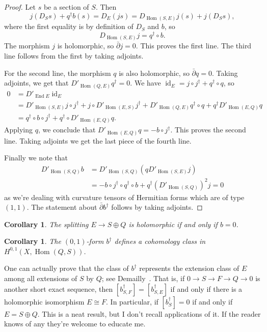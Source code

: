 \documentclass[10pt,a4paper]{article}
\newtheorem{coro}[theo]{Corollary}
\newtheorem*{proof}{Proof}
\DeclareMathOperator{\End}{End}
\DeclareMathOperator{\Hom}{Hom}
\DeclareMathOperator{\id}{id}
\begin{document}
\begin{proof}
Let $s$ be a section of $S$. Then
\[
j(D_S s) + q^\dagger b(s)
= D_E(js)
= D_{\Hom(S,E)}j (s) + j(D_S s),
\]
where the first equality is by definition of $D_S$ and $b$, so
\[
D_{\Hom(S,E)}j = q^\dagger \circ b.
\]
The morphism $j$ is holomorphic, so $\bar\partial j = 0$. This proves the first line. The third line follows from the first by taking adjoints.


For the second line, the morphism $q$ is also holomorphic, so $\bar\partial q = 0$. Taking adjoints, we get that $D'_{\Hom(Q,E)} q^\dagger = 0$.
We have $\id_E = j \circ j^\dagger + q^\dagger \circ q$, so
\begin{align*}
0
&= D'_{\End E} \id_E
\\
&= D'_{\Hom(S,E)} j \circ j^\dagger + j \circ D'_{\Hom(E,S)}j^\dagger
+ D'_{\Hom(Q,E)}q^\dagger \circ q + q^\dagger D'_{\Hom(E,Q)} q
\\
&= q^\dagger \circ b \circ j^\dagger + q^\dagger \circ D'_{\Hom(E,Q)}q.
\end{align*}
Applying $q$, we conclude that $D'_{\Hom(E,Q)}q = - b \circ j^\dagger$. This proves the second line. Taking adjoints we get the last piece of the fourth line.

Finally we note that
\begin{align*}
D'_{\Hom(S,Q)} b
&= D'_{\Hom(S,Q)} (q D'_{\Hom(S,E)}j)
\\
&= - b \circ j^\dagger \circ q^\dagger \circ b
+ q^\dagger (D'_{\Hom(S,Q)})^2 j
= 0
\end{align*}
as we're dealing with curvature tensors of Hermitian forms which are of type $(1,1)$. The statement about $\bar\partial b^\dagger$ follows by taking adjoints.
\end{proof}



\begin{coro}
The splitting $E \to S \oplus Q$ is holomorphic if and only if $b = 0$.
\end{coro}

\begin{coro}
The $(0,1)$-form $b^\dagger$ defines a cohomology class in $H^{0,1}(X, \Hom(Q,S))$.
\end{coro}

One can actually prove that the class of $b^\dagger$ represents the extension class of $E$ among all extensions of $S$ by $Q$; see Demailly~\cite[Proposition~14.9]{demailly-complex}. That is, if $0 \to S \to F \to Q \to 0$ is another short exact sequence, then $[b_{S,F}^\dagger] = [b_{S,E}^\dagger]$ if and only if there is a holomorphic isomorphism $E \cong F$. In particular, if $[b_S^\dagger] = 0$ if and only if $E = S \oplus Q$. This is a neat result, but I don't recall applications of it. If the reader knows of any they're welcome to educate me.
\end{document}

